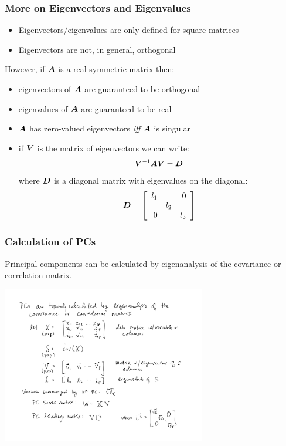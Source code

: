\documentclass{beamer}
\begin{document}
\begin{frame}
  \frametitle{More on Eigenvectors and Eigenvalues}

\begin{itemize}
 	\item Eigenvectors/eigenvalues are only defined for square matrices
	\item Eigenvectors are not, in general, orthogonal
\end{itemize}
\smallskip

However, if $\bm{A}$ is a real symmetric matrix then:
\begin{itemize}
	\item eigenvectors of $\bm{A}$ are guaranteed to be orthogonal
	\item eigenvalues of $\bm{A}$ are guaranteed to be real
	\item $\bm{A}$ has zero-valued eigenvectors \emph{iff} $\bm{A}$ is singular
	\item if $\bm{V}$ is the matrix of eigenvectors we can write:
\[
	\bm{V}^{-1} \bm{A} \bm{V} = \bm{D}
\]
where $\bm{D}$ is a diagonal matrix with eigenvalues on the diagonal:
\footnotesize{
\[\bm{D} = 
 \left[ \begin{array}{rrr}
l_1 &  & 0 \\
       & l_2 & \\
 0      &        &  l_3\\
\end{array}
\right]
\]
} %

\end{itemize}



\end{frame}

\begin{frame}[fragile]
  \frametitle{Calculation of PCs}

Principal components can be calculated by eigenanalysis of the covariance or correlation matrix.
\medskip


\begin{center}
\includegraphics[height=2.7in]{pca-eigen}
\end{center}  


\end{frame}
\end{document}
